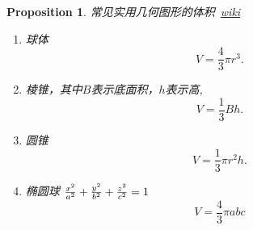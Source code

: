 \documentclass{article}
\newtheorem{proposition}[theorem]{Proposition}
\begin{document}
\begin{proposition}
\rm 常见实用几何图形的体积~\href{https://zh.wikipedia.org/wiki/\%E4\%BD\%93\%E7\%A7\%AF}{wiki}
\begin{enumerate}
	\item 球体
	$$
	V = \frac{4}{3}\pi r^3.
	$$
	\item 棱锥，其中$B$表示底面积，$h$表示高,
	$$
	V = \frac{1}{3}Bh.
	$$
	\item 圆锥
	$$
	V = \frac{1}{3}\pi r^2 h .
	$$
	\item 椭圆球 ${x^{2} \over a^{2}}+{y^{2} \over b^{2}}+{z^{2} \over c^{2}}=1$
	$$
	V = \frac{4}{3}\pi abc
	$$
\end{enumerate}
\end{proposition}
\end{document}
